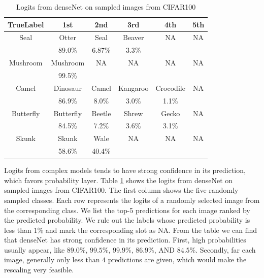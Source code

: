\documentclass{article}
\begin{document}
{\begin{table}
\begin{center}
\begin{tabular}{ |c|c|c|c|c|c| } 
 \hline
 TrueLabel & 1st & 2nd & 3rd & 4th & 5th \\
 \hline
 Seal   &   Otter  &   Seal   &   Beaver & NA & NA \\
        &   89.0\%          &   6.87\%          &   3.3\%   & & \\
 \hline
 Mushroom   &   Mushroom   & NA & NA & NA & NA \\
            &   99.5\%  &&&&\\
 \hline
 Camel  &   Dinosaur & Camel & Kangaroo & Crocodile & NA \\
        &   86.9\%  &   8.0\%   &   3.0\%   &   1.1\%   &   \\    
 \hline
 Butterfly  &   Butterfly & Beetle & Shrew & Gecko & NA \\
        &   84.5\%  &   7.2\%  &   3.6\%   &   3.1\%   &      \\
 \hline
 Skunk  &   Skunk   &   Wale    &   NA  &   NA  &   NA  \\
        &   58.6\%  &   40.4\%  &       &       &       \\
 \hline
\end{tabular}
\end{center}
\caption{Logits from denseNet on sampled images from CIFAR100}
\label{table:logitsDenseNet}
\end{table}
Logits from complex models tends to have strong confidence in its prediction, which favors probability layer. Table \ref{table:logitsDenseNet} shows the logits from denseNet on sampled images from CIFAR100. The first column shows the five randomly sampled classes. Each row represents the logits of a randomly selected image from the corresponding class. We list the top-5 predictions for each image ranked by the predicted probability. We rule out the labels whose predicted probability is less than $1$\% and mark the corresponding slot as NA. From the table we can find that denseNet has strong confidence in its prediction. First, high probabilities usually appear, like $89.0$\%, $99.5$\%, $99.9$\%, $86.9$\%, AND $84.5$\%. Secondly, far each image, generally only less than $4$ predictions are given, which would make the rescaling very feasible. 


}
\end{document}
